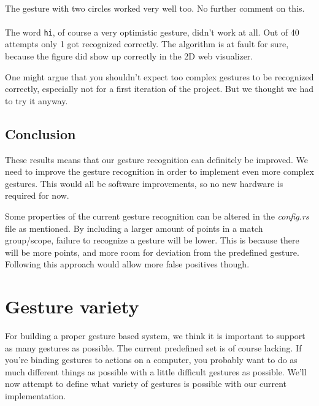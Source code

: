 \documentclass[a4paper]{article}
\begin{document}
  \paragraph{}
  The gesture with two circles worked very well too. No further comment on this.

  \paragraph{}
  The word \verb_hi_, of course a very optimistic gesture, didn't work at all.
  Out of 40 attempts only 1 got recognized correctly. The algorithm is at fault
  for sure, because the figure did show up correctly in the 2D web visualizer.

  One might argue that you shouldn't expect too complex gestures to be
  recognized correctly, especially not for a first iteration of the project. But
  we thought we had to try it anyway.

  \subsection{Conclusion}
  These results means that our gesture recognition can definitely be improved.
  We need to improve the gesture recognition in order to implement even more
  complex gestures. This would all be software improvements, so no new hardware
  is required for now.

  Some properties of the current gesture recognition can be altered in the
  \textit{config.rs} file as mentioned. By including a larger amount of points
  in a match group/scope, failure to recognize a gesture will be lower.
  This is because there will be more points, and more room for deviation from
  the predefined gesture. Following this approach would allow more false positives though.

  \clearpage

  \section{Gesture variety}
  For building a proper gesture based system, we think it is important to
  support as many gestures as possible. The current predefined set is of course
  lacking. If you're binding gestures to actions on
  a computer, you probably want to do as much different things as possible with
  a little difficult gestures as possible. We'll now attempt to define what
  variety of gestures is possible with our current implementation.
\end{document}
